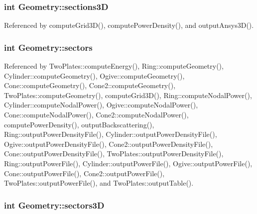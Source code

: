 \hypertarget{classGeometry_a296e0b45bd0e03ccdcee990cd1ee6ccb}{
\subsubsection[{sections3\-D}]{\setlength{\rightskip}{0pt plus 5cm}int Geometry\-::sections3\-D\hspace{0.3cm}{\ttfamily [protected]}}}\label{classGeometry_a296e0b45bd0e03ccdcee990cd1ee6ccb}


Referenced by compute\-Grid3\-D(), compute\-Power\-Density(), and output\-Ansys3\-D().

\hypertarget{classGeometry_a5e34644bfae4c1df92cb6bf98a8c62c7}{
\subsubsection[{sectors}]{\setlength{\rightskip}{0pt plus 5cm}int Geometry\-::sectors\hspace{0.3cm}{\ttfamily [protected]}}}\label{classGeometry_a5e34644bfae4c1df92cb6bf98a8c62c7}


Referenced by Two\-Plates\-::compute\-Energy(), Ring\-::compute\-Geometry(), Cylinder\-::compute\-Geometry(), Ogive\-::compute\-Geometry(), Cone\-::compute\-Geometry(), Cone2\-::compute\-Geometry(), Two\-Plates\-::compute\-Geometry(), compute\-Grid3\-D(), Ring\-::compute\-Nodal\-Power(), Cylinder\-::compute\-Nodal\-Power(), Ogive\-::compute\-Nodal\-Power(), Cone\-::compute\-Nodal\-Power(), Cone2\-::compute\-Nodal\-Power(), compute\-Power\-Density(), output\-Backscattering(), Ring\-::output\-Power\-Density\-File(), Cylinder\-::output\-Power\-Density\-File(), Ogive\-::output\-Power\-Density\-File(), Cone2\-::output\-Power\-Density\-File(), Cone\-::output\-Power\-Density\-File(), Two\-Plates\-::output\-Power\-Density\-File(), Ring\-::output\-Power\-File(), Cylinder\-::output\-Power\-File(), Ogive\-::output\-Power\-File(), Cone\-::output\-Power\-File(), Cone2\-::output\-Power\-File(), Two\-Plates\-::output\-Power\-File(), and Two\-Plates\-::output\-Table().

\hypertarget{classGeometry_a910a84dcf141a4f6eb3f565ac69339b6}{
\subsubsection[{sectors3\-D}]{\setlength{\rightskip}{0pt plus 5cm}int Geometry\-::sectors3\-D\hspace{0.3cm}{\ttfamily [protected]}}}\label{classGeometry_a910a84dcf141a4f6eb3f565ac69339b6}


